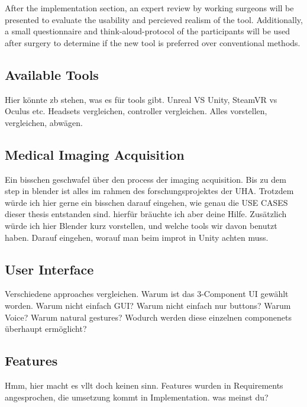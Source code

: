 After the implementation section, an expert review by working surgeons will be presented to evaluate the usability and percieved realism of the tool.
Additionally, a small questionnaire and think-aloud-protocol of the participants will be used after surgery to determine if the new tool is preferred over conventional methods.


\subsection{\label{sec::ApproachAvailableTools}Available Tools}

Hier könnte zb stehen, was es für tools gibt.
Unreal VS Unity, SteamVR vs Oculus etc.
Headsets vergleichen, controller vergleichen.
Alles vorstellen, vergleichen, abwägen.
%
%
\subsection{\label{sec::ApproachAcquisition}Medical Imaging Acquisition}
Ein bisschen geschwafel über den process der imaging acquisition.
Bis zu dem step in blender ist alles im rahmen des forschungsprojektes der UHA.
Trotzdem würde ich hier gerne ein bisschen darauf eingehen, wie genau die USE CASES
dieser thesis entstanden sind. hierfür bräuchte ich aber deine Hilfe.
Zusätzlich würde ich hier Blender kurz vorstellen, und welche tools wir davon benutzt haben.
Darauf eingehen, worauf man beim improt in Unity achten muss.
%
\subsection{\label{sec::ApproachUserInterface}User Interface}
Verschiedene approaches vergleichen.
Warum ist das 3-Component UI gewählt worden.
Warum nicht einfach GUI?
Warum nicht einfach nur buttons?
Warum Voice?
Warum natural gestures?
Wodurch werden diese einzelnen componenets überhaupt ermöglicht?

%
\subsection{\label{sec::ApproachFeatures}Features}
Hmm, hier macht es vllt doch keinen sinn. Features wurden in Requirements angesprochen,
die umsetzung kommt in Implementation. was meinst du?
%